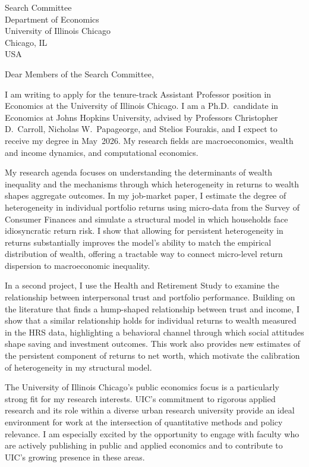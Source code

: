 \documentclass[11pt,letterpaper]{letter}
\begin{document}
\begin{letter}{Search Committee \\
Department of Economics \\
University of Illinois Chicago \\
Chicago, IL \\ USA}

\opening{Dear Members of the Search Committee,}

I am writing to apply for the tenure-track Assistant Professor position in Economics at the University of Illinois Chicago. I am a Ph.D.\ candidate in Economics at Johns Hopkins University, advised by Professors Christopher D.~Carroll, Nicholas W.~Papageorge, and Stelios Fourakis, and I expect to receive my degree in May~2026. My research fields are macroeconomics, wealth and income dynamics, and computational economics.

My research agenda focuses on understanding the determinants of wealth inequality and the mechanisms through which heterogeneity in returns to wealth shapes aggregate outcomes. In my job-market paper, I estimate the degree of heterogeneity in individual portfolio returns using micro-data from the Survey of Consumer Finances and simulate a structural model in which households face idiosyncratic return risk. I show that allowing for persistent heterogeneity in returns substantially improves the model’s ability to match the empirical distribution of wealth, offering a tractable way to connect micro-level return dispersion to macroeconomic inequality.

In a second project, I use the Health and Retirement Study to examine the relationship between interpersonal trust and portfolio performance. Building on the literature that finds a hump-shaped relationship between trust and income, I show that a similar relationship holds for individual returns to wealth measured in the HRS data, highlighting a behavioral channel through which social attitudes shape saving and investment outcomes. This work also provides new estimates of the persistent component of returns to net worth, which motivate the calibration of heterogeneity in my structural model.

The University of Illinois Chicago’s public economics focus is a particularly strong fit for my research interests. UIC’s commitment to rigorous applied research and its role within a diverse urban research university provide an ideal environment for work at the intersection of quantitative methods and policy relevance. I am especially excited by the opportunity to engage with faculty who are actively publishing in public and applied economics and to contribute to UIC’s growing presence in these areas.


\end{letter}
\end{document}
